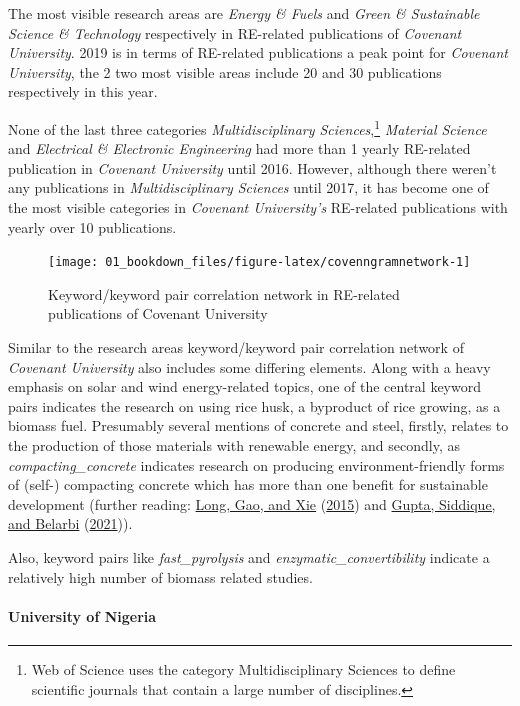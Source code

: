 \documentclass[
]{book}
\begin{document}
The most visible research areas are \emph{Energy \& Fuels} and \emph{Green \& Sustainable Science \& Technology} respectively in RE-related publications of \emph{Covenant University}. 2019 is in terms of RE-related publications a peak point for \emph{Covenant University}, the 2 two most visible areas include 20 and 30 publications respectively in this year.

None of the last three categories \emph{Multidisciplinary Sciences},\footnote{Web of Science uses the category Multidisciplinary Sciences to define scientific journals that contain a large number of disciplines.} \emph{Material Science} and \emph{Electrical \& Electronic Engineering} had more than 1 yearly RE-related publication in \emph{Covenant University} until 2016. However, although there weren't any publications in \emph{Multidisciplinary Sciences} until 2017, it has become one of the most visible categories in \emph{Covenant University's} RE-related publications with yearly over 10 publications.

\begin{figure}
\texttt{[image: 01\_bookdown\_files/figure-latex/covenngramnetwork-1]} \caption{Keyword/keyword pair correlation network in RE-related publications of Covenant University}\label{fig:covenngramnetwork}
\end{figure}

Similar to the research areas keyword/keyword pair correlation network of \emph{Covenant University} also includes some differing elements. Along with a heavy emphasis on solar and wind energy-related topics, one of the central keyword pairs indicates the research on using rice husk, a byproduct of rice growing, as a biomass fuel. Presumably several mentions of concrete and steel, firstly, relates to the production of those materials with renewable energy, and secondly, as \emph{compacting\_concrete} indicates research on producing environment-friendly forms of (self-) compacting concrete which has more than one benefit for sustainable development (further reading: \protect\hyperlink{ref-long2015}{Long, Gao, and Xie} (\protect\hyperlink{ref-long2015}{2015}) and \protect\hyperlink{ref-gupta2021}{Gupta, Siddique, and Belarbi} (\protect\hyperlink{ref-gupta2021}{2021})).

Also, keyword pairs like \emph{fast\_pyrolysis} and \emph{enzymatic\_convertibility} indicate a relatively high number of biomass related studies.

\hypertarget{university-of-nigeria}{%
\paragraph{University of Nigeria}\label{university-of-nigeria}}
\end{document}
